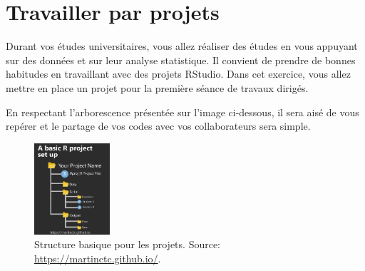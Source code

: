 \documentclass[
  11pt,
]{book}
\numberwithin{equation}{section}
\numberwithin{countremarque}{section}
\begin{document}
\hypertarget{travailler-par-projets}{%
\section{Travailler par projets}\label{travailler-par-projets}}

Durant vos études universitaires, vous allez réaliser des études en vous appuyant sur des données et sur leur analyse statistique. Il convient de prendre de bonnes habitudes en travaillant avec des projets RStudio. Dans cet exercice, vous allez mettre en place un projet pour la première séance de travaux dirigés.

En respectant l'arborescence présentée sur l'image ci-dessous, il sera aisé de vous repérer et le partage de vos codes avec vos collaborateurs sera simple.

\begin{figure}
\centering
\includegraphics[width=0.25\textwidth,height=\textheight]{figs/project_tree_structure.png}
\caption{Structure basique pour les projets. Source: \url{https://martinctc.github.io/}.}
\end{figure}
\end{document}
